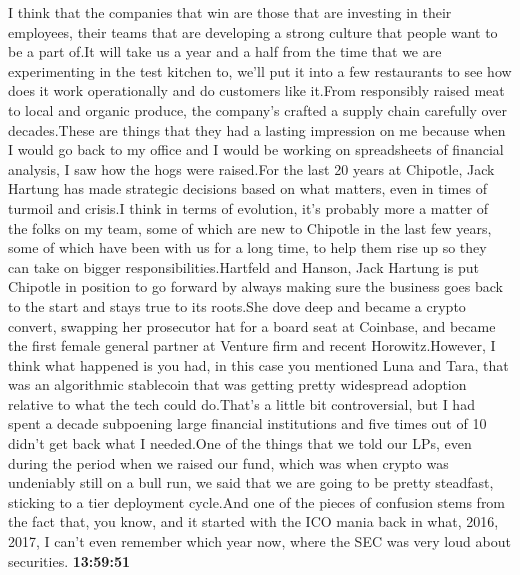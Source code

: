 \documentclass{article}%
\begin{document}
I think that the companies that win are those that are investing in their employees, their teams that are developing a strong culture that people want to be a part of.It will take us a year and a half from the time that we are experimenting in the test kitchen to, we'll put it into a few restaurants to see how does it work operationally and do customers like it.From responsibly raised meat to local and organic produce, the company's crafted a supply chain carefully over decades.These are things that they had a lasting impression on me because when I would go back to my office and I would be working on spreadsheets of financial analysis, I saw how the hogs were raised.For the last 20 years at Chipotle, Jack Hartung has made strategic decisions based on what matters, even in times of turmoil and crisis.I think in terms of evolution, it's probably more a matter of the folks on my team, some of which are new to Chipotle in the last few years, some of which have been with us for a long time, to help them rise up so they can take on bigger responsibilities.Hartfeld and Hanson, Jack Hartung is put Chipotle in position to go forward by always making sure the business goes back to the start and stays true to its roots.She dove deep and became a crypto convert, swapping her prosecutor hat for a board seat at Coinbase, and became the first female general partner at Venture firm and recent Horowitz.However, I think what happened is you had, in this case you mentioned Luna and Tara, that was an algorithmic stablecoin that was getting pretty widespread adoption relative to what the tech could do.That's a little bit controversial, but I had spent a decade subpoening large financial institutions and five times out of 10 didn't get back what I needed.One of the things that we told our LPs, even during the period when we raised our fund, which was when crypto was undeniably still on a bull run, we said that we are going to be pretty steadfast, sticking to a tier deployment cycle.And one of the pieces of confusion stems from the fact that, you know, and it started with the ICO mania back in what, 2016, 2017, I can't even remember which year now, where the SEC was very loud about securities.%
\textbf{13:59:51}%
\end{document}
